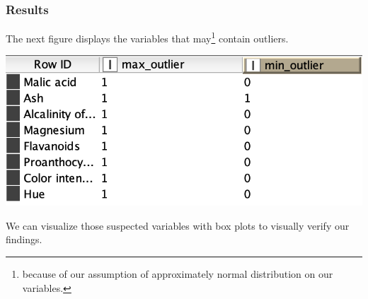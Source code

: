 \documentclass[11pt]{article}
\begin{document}
			\subsubsection*{Results}
				The next figure displays the variables that may\footnote{because of our assumption of approximately normal distribution on our variables.} contain outliers.
				\iftrue
				\begin{center}
					\includegraphics[scale=0.5]{res/t0/t03/t03-results}
				\end{center}
				\fi
				We can visualize those suspected variables with box plots to visually verify our findings.
				\iftrue
\end{document}
